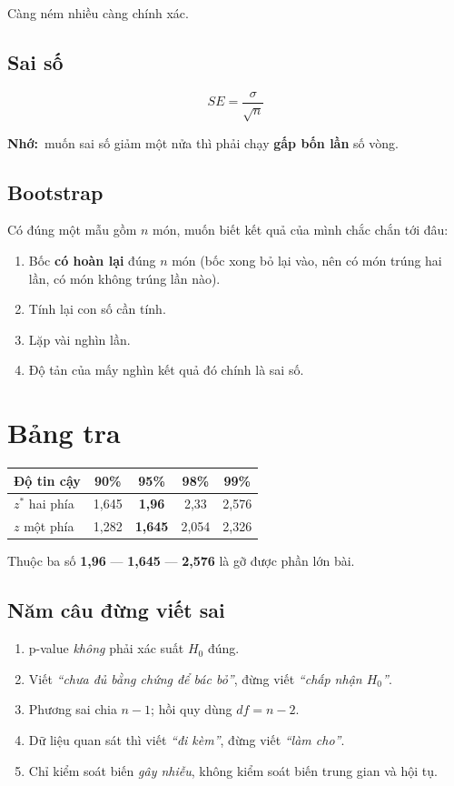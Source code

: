 \documentclass[12pt]{article}
\newcommand{\nho}{\textbf{Nhớ:}\ }
\begin{document}
Càng ném nhiều càng chính xác.

\subsection*{Sai số}

\[
SE = \frac{\sigma}{\sqrt{n}}
\]

\nho muốn sai số giảm một nửa thì phải chạy \textbf{gấp bốn lần} số vòng.

\subsection*{Bootstrap}

Có đúng một mẫu gồm $n$ món, muốn biết kết quả của mình chắc chắn tới đâu:

\begin{enumerate}
\item Bốc \textbf{có hoàn lại} đúng $n$ món (bốc xong bỏ lại vào, nên có món trúng
      hai lần, có món không trúng lần nào).
\item Tính lại con số cần tính.
\item Lặp vài nghìn lần.
\item Độ tản của mấy nghìn kết quả đó chính là sai số.
\end{enumerate}

\section{Bảng tra}

\begin{center}
\begin{tabular}{@{}lcccc@{}}
\toprule
\textbf{Độ tin cậy} & 90\% & 95\% & 98\% & 99\% \\
\midrule
$z^{*}$ hai phía & 1,645 & \textbf{1,96} & 2,33 & 2,576 \\
$z$ một phía & 1,282 & \textbf{1,645} & 2,054 & 2,326 \\
\bottomrule
\end{tabular}
\end{center}

Thuộc ba số \textbf{1,96} --- \textbf{1,645} --- \textbf{2,576} là gỡ được phần lớn bài.

\subsection*{Năm câu đừng viết sai}

\begin{enumerate}
\item p-value \emph{không} phải xác suất $H_0$ đúng.
\item Viết \emph{``chưa đủ bằng chứng để bác bỏ''}, đừng viết \emph{``chấp nhận $H_0$''}.
\item Phương sai chia $n-1$; hồi quy dùng $df = n-2$.
\item Dữ liệu quan sát thì viết \emph{``đi kèm''}, đừng viết \emph{``làm cho''}.
\item Chỉ kiểm soát biến \emph{gây nhiễu}, không kiểm soát biến trung gian và hội tụ.
\end{enumerate}
\end{document}
